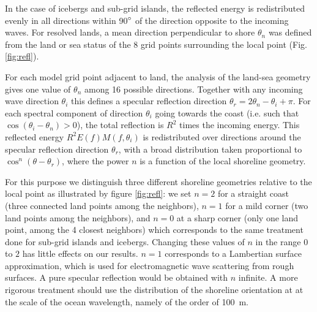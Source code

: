 In the case of icebergs and sub-grid islands, the reflected energy is
redistributed evenly in all directions within 90$^\circ$ of the direction
opposite to the incoming waves.  For resolved lands, a mean direction
perpendicular to shore $\theta_n$ was defined from the land or sea status of
the 8 grid points surrounding the local point (Fig. \ref{fig:refl}).

For each model grid point adjacent to land, the analysis of the land-sea
geometry gives one value of $\theta_n$ among 16 possible directions. Together
with any incoming wave direction $\theta_i$ this defines a specular reflection
direction $\theta_r=2 \theta_n - \theta_i + \pi$.  For each spectral component
of direction $\theta_i$ going towards the coast (i.e. such that
$\cos(\theta_i-\theta_n) >0$), the total reflection is $R^2$ times the
incoming energy. This reflected energy $R^2 E(f) M(f,\theta_i)$ is
redistributed over directions around the specular reflection direction
$\theta_r$, with a broad distribution taken proportional to
$\cos^n(\theta-\theta_r)$, where the power $n$ is a function of the local
shoreline geometry.

For this purpose we distinguish three different shoreline geometries relative
to the local point as illustrated by figure \ref{fig:refl}: we set $n=2$ for a
straight coast (three connected land points among the neighbors), $n=1$ for a
mild corner (two land points among the neighbors), and $n=0$ at a sharp corner
(only one land point, among the 4 closest neighbors) which corresponds to the
same treatment done for sub-grid islands and icebergs. Changing these values
of $n$ in the range $0$ to $2$ has little effects on our results.  $n=1$
corresponds to a Lambertian surface approximation, which is used for
electromagnetic wave scattering from rough surfaces. A pure specular
reflection would be obtained with $n$ infinite.  A more rigorous treatment
should use the distribution of the shoreline orientation at at the scale of
the ocean wavelength, namely of the order of 100~m.
